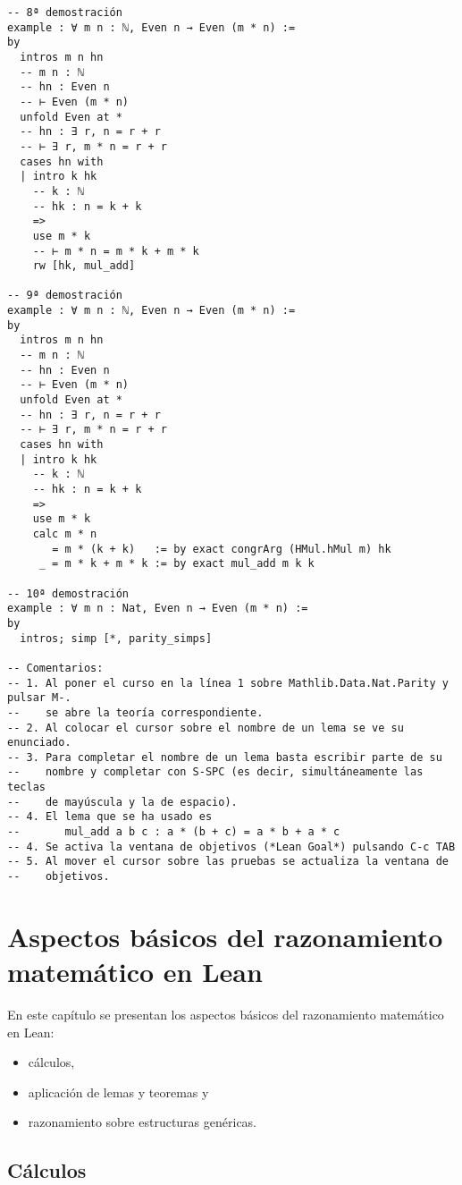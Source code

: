 \begin{verbatim}
-- 8ª demostración
example : ∀ m n : ℕ, Even n → Even (m * n) :=
by
  intros m n hn
  -- m n : ℕ
  -- hn : Even n
  -- ⊢ Even (m * n)
  unfold Even at *
  -- hn : ∃ r, n = r + r
  -- ⊢ ∃ r, m * n = r + r
  cases hn with
  | intro k hk
    -- k : ℕ
    -- hk : n = k + k
    =>
    use m * k
    -- ⊢ m * n = m * k + m * k
    rw [hk, mul_add]

-- 9ª demostración
example : ∀ m n : ℕ, Even n → Even (m * n) :=
by
  intros m n hn
  -- m n : ℕ
  -- hn : Even n
  -- ⊢ Even (m * n)
  unfold Even at *
  -- hn : ∃ r, n = r + r
  -- ⊢ ∃ r, m * n = r + r
  cases hn with
  | intro k hk
    -- k : ℕ
    -- hk : n = k + k
    =>
    use m * k
    calc m * n
       = m * (k + k)   := by exact congrArg (HMul.hMul m) hk
     _ = m * k + m * k := by exact mul_add m k k

-- 10ª demostración
example : ∀ m n : Nat, Even n → Even (m * n) :=
by
  intros; simp [*, parity_simps]

-- Comentarios:
-- 1. Al poner el curso en la línea 1 sobre Mathlib.Data.Nat.Parity y pulsar M-.
--    se abre la teoría correspondiente.
-- 2. Al colocar el cursor sobre el nombre de un lema se ve su enunciado.
-- 3. Para completar el nombre de un lema basta escribir parte de su
--    nombre y completar con S-SPC (es decir, simultáneamente las teclas
--    de mayúscula y la de espacio).
-- 4. El lema que se ha usado es
--       mul_add a b c : a * (b + c) = a * b + a * c
-- 4. Se activa la ventana de objetivos (*Lean Goal*) pulsando C-c TAB
-- 5. Al mover el cursor sobre las pruebas se actualiza la ventana de
--    objetivos.
\end{verbatim}

\chapter{Aspectos básicos del razonamiento matemático en Lean}
\label{sec:org2ccb0be}

En este capítulo se presentan los aspectos básicos del razonamiento matemático
en Lean:
\begin{itemize}
\item cálculos,
\item aplicación de lemas y teoremas y
\item razonamiento sobre estructuras genéricas.
\end{itemize}

\section{Cálculos}
\label{sec:org56e2315}

